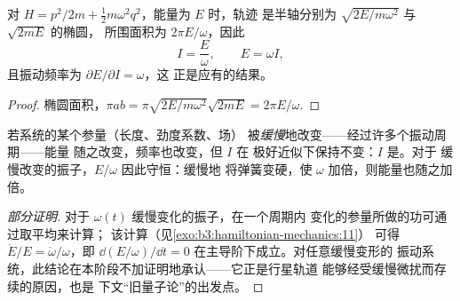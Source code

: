 \begin{proposition}[谐振子的作用量]\label{prop:b3:hamiltonian-mechanics:sho-action}
对 $H = p^2/2m + \tfrac12 m\omega^2q^2$，能量为 $E$ 时，轨迹
是半轴分别为 $\sqrt{2E/m\omega^2}$ 与 $\sqrt{2mE}$ 的椭圆，
所围面积为 $2\pi E/\omega$，因此
\[
I = \frac{E}{\omega} , \qquad E = \omega I ,
\]
且振动频率为 $\partial E/\partial I = \omega$，这
正是应有的结果。
\end{proposition}

\begin{proof}
椭圆面积，$\pi ab = \pi\sqrt{2E/m\omega^2}\sqrt{2mE} =
2\pi E/\omega$.
\end{proof}

\begin{proposition}[绝热不变性]\label{prop:b3:hamiltonian-mechanics:adiabatic}
若系统的某个参量（长度、劲度系数、场）
被\emph{缓慢}地改变——经过许多个振动周期——能量
随之改变，频率也改变，但 $I$ 在
极好近似下保持不变：$I$ 是\emph{}。对于
缓慢改变的振子，$E/\omega$ 因此守恒：缓慢地
将弹簧变硬，使 $\omega$ 加倍，则能量也随之加倍。
\end{proposition}

\begin{proof}[部分证明]
对于 $\omega(t)$ 缓慢变化的振子，在一个周期内
变化的参量所做的功可通过取平均来计算；
该计算（见\cref{exo:b3:hamiltonian-mechanics:11}）
可得 $\dot E/E = \dot\omega/\omega$，即 $\dd(E/\omega)/\dd t = 0$
在主导阶下成立。对任意缓慢变形的
振动系统，此结论在本阶段不加证明地承认——它正是行星轨道
能够经受缓慢微扰而存续的原因，也是
下文“旧量子论”的出发点。
\end{proof}

